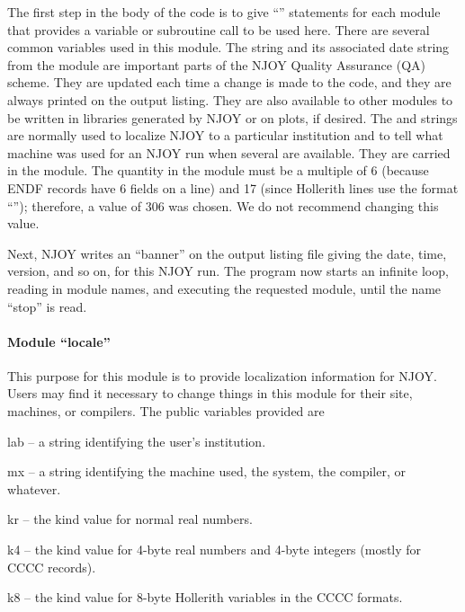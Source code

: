 The first step in the body of the code is to give ``''
statements for each module that provides a variable or subroutine
call to be used here.   There are several common variables used in
this module.  The  string and its associated date string
 from the 
module are important parts of the NJOY Quality Assurance (QA) scheme.
They are updated each time a change is made to the code, and they are
always printed on the output listing.  They are also available to other
modules to be written in libraries generated by NJOY or on plots,
if desired.  The  and  strings are normally used to
localize NJOY to a particular institution and to tell what machine was used
for an NJOY run when several are available.  They are carried in the
 module.  The quantity
 in the  module must be a
multiple of 6 (because ENDF records have 6 fields on a line) and 17
(since Hollerith lines use the format ``''); therefore,
a value of 306 was chosen.  We do not recommend changing this value.

Next, NJOY writes an ``banner'' on the output listing file giving the date,
time, version, and so on, for this NJOY run.  The program now starts an
infinite loop, reading in module names, and executing the requested module,
until the name ``stop'' is read.

\paragraph{Module ``locale''}

This purpose for this module is to provide localization information
for NJOY.  Users may find it necessary to change things in this
module for their site, machines, or compilers.  The public variables
provided are

\begin{description}
\begin{singlespace}
\item[lab --] a string identifying the user's institution.

\item[mx --] a string identifying the machine used, the system,
  the compiler, or whatever.

\item[kr --] the kind value for normal real numbers.

\item[k4 --] the kind value for 4-byte real numbers and 4-byte
  integers (mostly for CCCC records).

\item[k8 --] the kind value for 8-byte Hollerith variables in
  the CCCC formats.
\end{singlespace}
\end{description}

